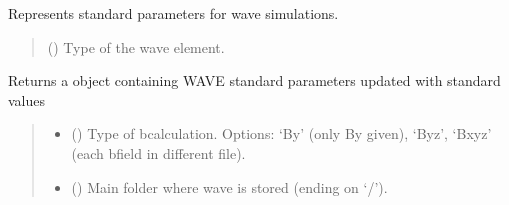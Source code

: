 \documentclass[letterpaper,10pt,english]{sphinxmanual}
\begin{document}
\begin{fulllineitems}
\label{\detokenize{API:wavepy.standard_parameters.StdParameters}}
\pysigstartsignatures
{}
\pysigstopsignatures
\sphinxAtStartPar
Represents standard parameters for wave simulations.
\begin{quote}\begin{description}
\sphinxAtStartPar
{} (\sphinxstyleliteralemphasis{\sphinxupquote{, }}) \textendash{} Type of the wave element.

\end{description}\end{quote}

\begin{fulllineitems}
\label{\detokenize{API:wavepy.standard_parameters.StdParameters.get_std_paras}}
\pysigstartsignatures
{}
\pysigstopsignatures
\sphinxAtStartPar
Returns a object containing WAVE standard parameters updated with standard values
\begin{quote}\begin{description}
\begin{itemize}
\item {} 
\sphinxAtStartPar
{} () \textendash{} Type of b\sphinxhyphen{}calculation. Options: ‘By’ (only By given), ‘Byz’, ‘Bxyz’ (each b\sphinxhyphen{}field in different file).

\item {} 
\sphinxAtStartPar
{} () \textendash{} Main folder where wave is stored (ending on ‘/’).


\end{itemize}
\end{description}
\end{quote}
\end{fulllineitems}
\end{fulllineitems}
\end{document}
